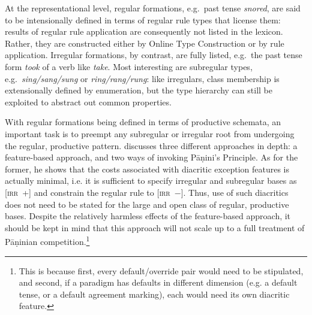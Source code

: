 \documentclass[output=paper
	        ,collection
	        ,collectionchapter
 	        ,biblatex
                ,babelshorthands
                ,newtxmath
                ,draftmode
                ,colorlinks, citecolor=brown
]{langscibook}
\begin{document}
\begin{exe}
\begin{xlist}
At the representational level, regular formations, e.g.\ past tense
\textit{snored}, are said to be intensionally defined in terms of
regular rule types that license them: results of regular rule
application are consequently not listed in the lexicon. Rather, they are
constructed either by Online Type Construction or by rule application.
Irregular formations, by contrast, are fully listed, e.g.\ the past
tense form \textit{took} of a verb like \textit{take}. Most
interesting are subregular types, e.g.\ \textit{sing/sang/sung} or
\textit{ring/rang/rung}: like irregulars, class membership is
extensionally defined by enumeration, but the type hierarchy can still
be exploited to abstract out common properties.

With regular formations being defined in terms of productive schemata,
an important task is to preempt any subregular or irregular root from
undergoing the regular, productive pattern. \citet{Koenig99} discusses
three different approaches in depth: a feature-based approach, and two
ways of invoking Pāṇini's Principle. As for the former, he shows that
the costs associated with diacritic exception features is actually
minimal, i.e. it is sufficient to specify irregular and subregular
bases as \textsc{[irr~+]} and constrain the regular rule to
\textsc{[irr~$-$]}. Thus, use of such diacritics does not need to be
stated for the large and open class of regular, productive
bases. Despite the relatively harmless effects of the feature-based
approach, it should be kept in mind that this approach will not scale
up to a full treatment of Pāṇinian competition.\footnote{This is
  because first, every default/override pair would need to be
  stipulated, and second, if a paradigm has defaults in different
  dimension (e.g. a default tense, or a default agreement marking),
  each would need its own diacritic feature.}


\end{xlist}
\end{exe}
\end{document}
